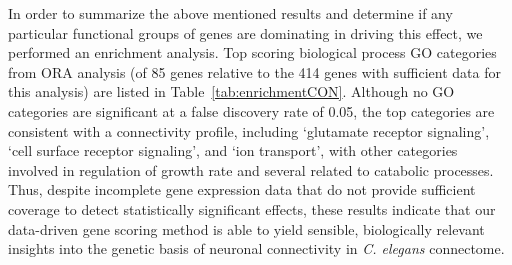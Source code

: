\documentclass[10pt,letterpaper]{article}
\begin{document}
{In order to summarize the above mentioned results and determine if any particular functional groups of genes are dominating in driving this effect, we performed an enrichment analysis.
Top scoring biological process GO categories from ORA analysis (of 85 genes relative to the 414 genes with sufficient data for this analysis) are listed in Table~\ref{tab:enrichmentCON}.
Although no GO categories are significant at a false discovery rate of 0.05, the top categories are consistent with a connectivity profile, including `glutamate receptor signaling', `cell surface receptor signaling', and `ion transport', with other categories involved in regulation of growth rate and several related to catabolic processes.
Thus, despite incomplete gene expression data that do not provide sufficient coverage to detect statistically significant effects, these results indicate that our data-driven gene scoring method is able to yield sensible, biologically relevant insights into the genetic basis of neuronal connectivity in \textit{C. elegans} connectome.

}
\end{document}

